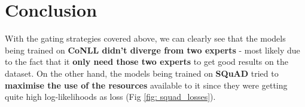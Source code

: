 \documentclass[12pt]{article}
\begin{document}
\section{Conclusion}
With the gating strategies covered above, we can clearly see that the models being trained on \textbf{CoNLL didn't diverge from two experts} - most likely due to the fact that it \textbf{only need those two experts} to get good results on the dataset. On the other hand, the models being trained on \textbf{SQuAD} tried to \textbf{maximise the use of the resources} available to it since they were getting quite high log-likelihoods as loss (Fig \ref{fig: squad_losses}).
\end{document}
